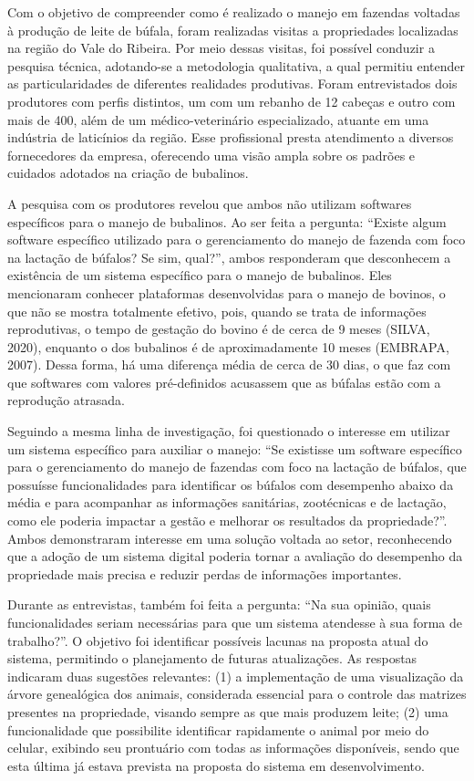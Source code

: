 Com o objetivo de compreender como é realizado o manejo em fazendas voltadas à produção de leite de búfala, foram realizadas visitas a propriedades localizadas na região do Vale do Ribeira. Por meio dessas visitas, foi possível conduzir a pesquisa técnica, adotando-se a metodologia qualitativa, a qual permitiu entender as particularidades de diferentes realidades produtivas. Foram entrevistados dois produtores com perfis distintos, um com um rebanho de 12 cabeças e outro com mais de 400, além de um médico-veterinário especializado, atuante em uma indústria de laticínios da região. Esse profissional presta atendimento a diversos fornecedores da empresa, oferecendo uma visão ampla sobre os padrões e cuidados adotados na criação de bubalinos.

A pesquisa com os produtores revelou que ambos não utilizam softwares específicos para o manejo de bubalinos. Ao ser feita a pergunta: “Existe algum software específico utilizado para o gerenciamento do manejo de fazenda com foco na lactação de búfalos? Se sim, qual?”, ambos responderam que desconhecem a existência de um sistema específico para o manejo de bubalinos. Eles mencionaram conhecer plataformas desenvolvidas para o manejo de bovinos, o que não se mostra totalmente efetivo, pois, quando se trata de informações reprodutivas, o tempo de gestação do bovino é de cerca de 9 meses (SILVA, 2020), enquanto o dos bubalinos é de aproximadamente 10 meses (EMBRAPA, 2007). Dessa forma, há uma diferença média de cerca de 30 dias, o que faz com que softwares com valores pré-definidos acusassem que as búfalas estão com a reprodução atrasada.

Seguindo a mesma linha de investigação, foi questionado o interesse em utilizar um sistema específico para auxiliar o manejo: “Se existisse um software específico para o gerenciamento do manejo de fazendas com foco na lactação de búfalos, que possuísse funcionalidades para identificar os búfalos com desempenho abaixo da média e para acompanhar as informações sanitárias, zootécnicas e de lactação, como ele poderia impactar a gestão e melhorar os resultados da propriedade?”. Ambos demonstraram interesse em uma solução voltada ao setor, reconhecendo que a adoção de um sistema digital poderia tornar a avaliação do desempenho da propriedade mais precisa e reduzir perdas de informações importantes.

Durante as entrevistas, também foi feita a pergunta: “Na sua opinião, quais funcionalidades seriam necessárias para que um sistema atendesse à sua forma de trabalho?”. O objetivo foi identificar possíveis lacunas na proposta atual do sistema, permitindo o planejamento de futuras atualizações. As respostas indicaram duas sugestões relevantes: (1) a implementação de uma visualização da árvore genealógica dos animais, considerada essencial para o controle das matrizes presentes na propriedade, visando sempre as que mais produzem leite; (2) uma funcionalidade que possibilite identificar rapidamente o animal por meio do celular, exibindo seu prontuário com todas as informações disponíveis, sendo que esta última já estava prevista na proposta do sistema em desenvolvimento.


